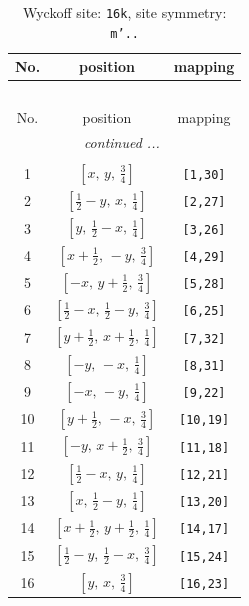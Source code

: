 \documentclass[fleqn,8pt]{jsarticle}
\begin{document}
\renewcommand{\arraystretch}{1.2}
\begin{longtable}{ccc}
\caption{Wyckoff site: {\tt 16k}, site symmetry: {\tt m'..}}
 \\
 \hline \hline
No. & position & mapping \\ \hline \endfirsthead

\multicolumn{2}{l}{\tablename\ \thetable{}} \\
 \hline \hline
No. & position & mapping \\ \hline \endhead

 \hline \hline
\multicolumn{2}{r}{\footnotesize\it continued ...} \\ \endfoot

 \hline \hline
\multicolumn{2}{r}{} \\ \endlastfoot

1 & $\left[ x,\, y,\, \frac{3}{4} \right]$ & {\tt [1,30]} \\ \hline
2 & $\left[ \frac{1}{2} - y,\, x,\, \frac{1}{4} \right]$ & {\tt [2,27]} \\ \hline
3 & $\left[ y,\, \frac{1}{2} - x,\, \frac{1}{4} \right]$ & {\tt [3,26]} \\ \hline
4 & $\left[ x + \frac{1}{2},\, - y,\, \frac{3}{4} \right]$ & {\tt [4,29]} \\ \hline
5 & $\left[ - x,\, y + \frac{1}{2},\, \frac{3}{4} \right]$ & {\tt [5,28]} \\ \hline
6 & $\left[ \frac{1}{2} - x,\, \frac{1}{2} - y,\, \frac{3}{4} \right]$ & {\tt [6,25]} \\ \hline
7 & $\left[ y + \frac{1}{2},\, x + \frac{1}{2},\, \frac{1}{4} \right]$ & {\tt [7,32]} \\ \hline
8 & $\left[ - y,\, - x,\, \frac{1}{4} \right]$ & {\tt [8,31]} \\ \hline
9 & $\left[ - x,\, - y,\, \frac{1}{4} \right]$ & {\tt [9,22]} \\ \hline
10 & $\left[ y + \frac{1}{2},\, - x,\, \frac{3}{4} \right]$ & {\tt [10,19]} \\ \hline
11 & $\left[ - y,\, x + \frac{1}{2},\, \frac{3}{4} \right]$ & {\tt [11,18]} \\ \hline
12 & $\left[ \frac{1}{2} - x,\, y,\, \frac{1}{4} \right]$ & {\tt [12,21]} \\ \hline
13 & $\left[ x,\, \frac{1}{2} - y,\, \frac{1}{4} \right]$ & {\tt [13,20]} \\ \hline
14 & $\left[ x + \frac{1}{2},\, y + \frac{1}{2},\, \frac{1}{4} \right]$ & {\tt [14,17]} \\ \hline
15 & $\left[ \frac{1}{2} - y,\, \frac{1}{2} - x,\, \frac{3}{4} \right]$ & {\tt [15,24]} \\ \hline
16 & $\left[ y,\, x,\, \frac{3}{4} \right]$ & {\tt [16,23]} \\
\end{longtable}
\end{document}
